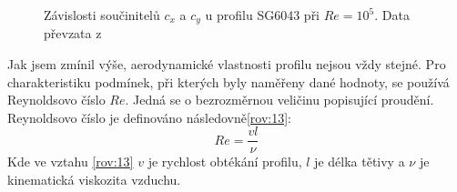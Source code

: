 \begin{figure}[H]
	\caption{Závislosti součinitelů $c_x$ a $c_y$ u profilu SG6043 při $Re=10^5$. Data převzata z \cite{profil}}
	\end{figure}
	
	Jak jsem zmínil výše, aerodynamické vlastnosti profilu nejsou vždy stejné. Pro charakteristiku podmínek, při kterých byly naměřeny dané hodnoty, se používá Reynoldsovo číslo $Re$. Jedná se o bezrozměrnou veličinu popisující proudění. Reynoldsovo číslo je definováno následovně\eqref{rov:13}\cite{Rychetnik:Motory}:
	\begin{equation}
					\label{rov:13}
					Re=\frac{vl}{\nu}
	\end{equation}
	Kde ve vztahu \eqref{rov:13} $v$ je rychlost obtékání profilu, $l$ je délka tětivy a $\nu$ je kinematická viskozita vzduchu.
	

